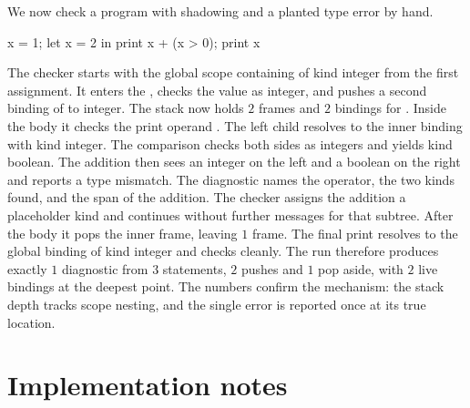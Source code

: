 We now check a program with shadowing and a planted type error by hand.
\begin{irlisting}
x = 1;
let x = 2 in print x + (x > 0);
print x
\end{irlisting}
The checker starts with the global scope containing  of kind integer from the first assignment.
It enters the , checks the value  as integer, and pushes a second binding of  to integer.
The stack now holds $2$ frames and $2$ bindings for .
Inside the body it checks the print operand .
The left child  resolves to the inner binding with kind integer.
The comparison  checks both sides as integers and yields kind boolean.
The addition then sees an integer on the left and a boolean on the right and reports a type mismatch.
The diagnostic names the operator, the two kinds found, and the span of the addition.
The checker assigns the addition a placeholder kind and continues without further messages for that subtree.
After the body it pops the inner frame, leaving $1$ frame.
The final print resolves  to the global binding of kind integer and checks cleanly.
The run therefore produces exactly $1$ diagnostic from $3$ statements, $2$ pushes and $1$ pop aside, with $2$ live bindings at the deepest point.
The numbers confirm the mechanism: the stack depth tracks scope nesting, and the single error is reported once at its true location.

\section{Implementation notes}
\label{sec:ch05-implementation}

